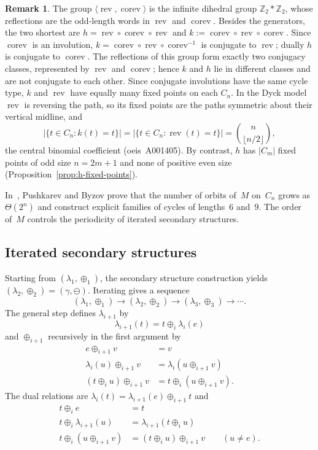 \documentclass[a4paper,11pt]{article}
\theoremstyle{definition}
\newtheorem{remark}[theorem]{Remark}
\DeclareMathOperator{\rev}{rev}
\DeclareMathOperator{\corev}{corev}
\newcommand\oeis{{\sc oeis}}
\begin{document}
\begin{remark}
  The group $\langle\rev,\corev\rangle$ is the infinite dihedral group
  $\mathbb{Z}_2*\mathbb{Z}_2$, whose reflections are the odd-length
  words in $\rev$ and $\corev$. Besides the generators, the two shortest
  are $h=\rev\circ\corev\circ\rev$ and
  $k:=\corev\circ\rev\circ\corev$. Since $\corev$ is an involution,
  $k=\corev\circ\rev\circ\corev^{-1}$ is conjugate to $\rev$; dually $h$
  is conjugate to $\corev$. The reflections of this group form exactly
  two conjugacy classes, represented by $\rev$ and $\corev$; hence $k$
  and $h$ lie in different classes and are not conjugate to each other.
  Since conjugate involutions have
  the same cycle type, $k$ and $\rev$ have equally many fixed points
  on each $C_n$. In the Dyck model $\rev$ is reversing the
  path, so its fixed points are the paths symmetric about their vertical
  midline, and
  \[
    |\{t \in C_n : k(t) = t\}|
    = |\{t \in C_n : \rev(t) = t\}|
    = \binom{n}{\lfloor n/2\rfloor},
  \]
  the central binomial coefficient (\oeis\ A001405). By contrast, $h$
  has $|C_m|$ fixed points of odd size $n = 2m+1$ and none of positive
  even size (Proposition~\ref{prop:h-fixed-points}).
\end{remark}

In~\cite{PushkarevByzov19}, Pushkarev and Byzov prove
that the number of orbits of~$M$ on~$C_n$ grows as
$\Theta(2^n)$ and construct explicit families of cycles
of lengths~$6$ and~$9$.
The order of~$M$ controls the periodicity of iterated
secondary structures.

\subsection{Iterated secondary structures}\label{sec:iterated}

Starting from $(\lambda_1, \oplus_1)$, the
secondary structure construction yields
$(\lambda_2, \oplus_2) = (\gamma, \ominus)$. Iterating
gives a sequence
\[
  (\lambda_1, \oplus_1) \to (\lambda_2, \oplus_2)
    \to (\lambda_3, \oplus_3) \to \cdots.
\]
The general step defines $\lambda_{i+1}$ by
\[
    \lambda_{i+1}(t) = t \oplus_i \lambda_i(e)
\]
and $\oplus_{i+1}$ recursively in the first argument by
\begin{align*}
           e \oplus_{i+1} v &= v \\
       \lambda_i(u) \oplus_{i+1} v
         &= \lambda_i(u \oplus_{i+1} v) \\
    (t \oplus_i u) \oplus_{i+1} v
      &= t \oplus_i (u \oplus_{i+1} v).
\end{align*}
The dual relations are
$\lambda_i(t) = \lambda_{i+1}(e) \oplus_{i+1} t$ and
\begin{align*}
    t \oplus_i e &= t \\
    t \oplus_i \lambda_{i+1}(u)
      &= \lambda_{i+1}(t \oplus_i u) \\
    t \oplus_i (u \oplus_{i+1} v)
      &= (t \oplus_i u) \oplus_{i+1} v \qquad (u \neq e).
\end{align*}
\end{document}

